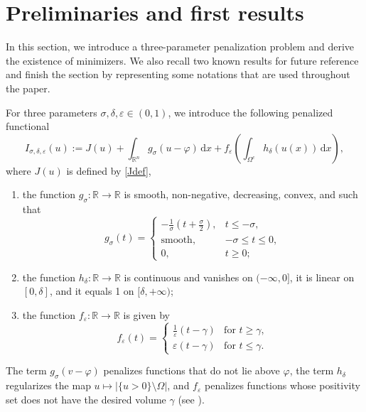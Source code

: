 \documentclass[11pt, reqno]{amsart}
\numberwithin{equation}{section}
\numberwithin{theorem}{section}
\numberwithin{lemma}{section}
\numberwithin{corollary}{section}
\numberwithin{remark}{section}
\numberwithin{proposition}{section}
\numberwithin{definition}{section}
\newcommand{\dd}{\, \mathrm{d}}
\newcommand{\R}{\mathbb{R}}
\newcommand{\e}{\varepsilon}
\begin{document}
\section{Preliminaries and first results}\label{prelim}
In this section, we introduce a three-parameter penalization problem and derive the existence of minimizers. We also recall two known results for future reference and finish the section by representing some notations that are used throughout the paper.

\smallskip

For three parameters $\sigma, \delta,\e\in (0,1)$, we introduce the following penalized functional
\begin{equation}\label{2.1}
I_{\sigma,\delta,\varepsilon}(u):=J(u) + \int_{\R^n} g_\sigma(u-\varphi) \,\mathrm{d} x + f_\varepsilon\left(\int_{\Omega^c} h_\delta(u(x))\dd x\right),
\end{equation}
where $J(u)$ is defined by \eqref{Jdef},   
\begin{enumerate}[$(i)$]
\item the function $g_\sigma:\R\to\R$ is smooth, non-negative, decreasing, convex, and such that 
$$
g_\sigma(t)=
\begin{cases} -\frac{1}{\sigma}(t+\frac{\sigma}{2}), & t\le -\sigma, \\ \text{smooth}, &  -\sigma\le t \le 0, \\ 0, &   t\ge0;
\end{cases}	
$$
\item the function $h_\delta:\R\rightarrow\R$  is continuous and vanishes on $(-\infty,0]$, it is linear on~$[0,\delta]$, and it equals 1 on $[\delta,+\infty)$;
\item the function $f_\varepsilon:\R\rightarrow\R$ is given by 
$$ 
f_\e(t)=\begin{cases} \frac{1}{\e}(t-\gamma) & \text{for }t\ge\gamma, \\ \varepsilon(t-\gamma) & \text{for }t\leq\gamma. \end{cases}	
$$	
\end{enumerate}
The term $g_\sigma(v-\varphi)$ penalizes functions that do not lie above $\varphi$, the term $h_\delta$ regularizes the map $u\mapsto|\{u>0\}\setminus\Omega|$, and $f_\varepsilon$ penalizes functions whose positivity set does not have the desired volume $\gamma$  (see \cite{TU17,Y16}).
\end{document}

